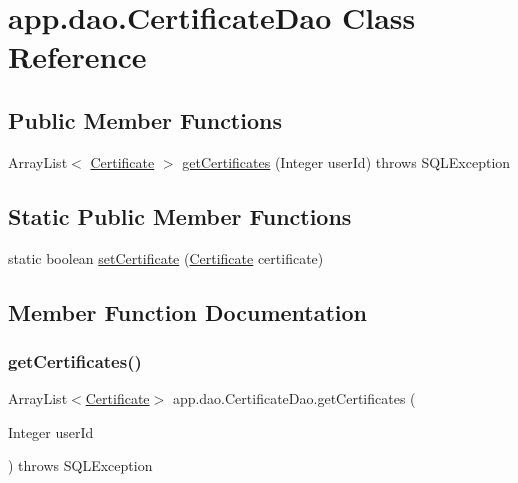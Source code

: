 \hypertarget{classapp_1_1dao_1_1_certificate_dao}{}\section{app.\+dao.\+Certificate\+Dao Class Reference}
\label{classapp_1_1dao_1_1_certificate_dao}
\subsection*{Public Member Functions}
\begin{DoxyCompactItemize}
\item 
Array\+List$<$ \mbox{\hyperlink{classapp_1_1entity_1_1_certificate}{Certificate}} $>$ \mbox{\hyperlink{classapp_1_1dao_1_1_certificate_dao_a62635ecd7b619b079f7a42bea0957257}{get\+Certificates}} (Integer user\+Id)  throws S\+Q\+L\+Exception 
\end{DoxyCompactItemize}
\subsection*{Static Public Member Functions}
\begin{DoxyCompactItemize}
\item 
static boolean \mbox{\hyperlink{classapp_1_1dao_1_1_certificate_dao_ade18e806b7233ecf641badf6d7fc2c52}{set\+Certificate}} (\mbox{\hyperlink{classapp_1_1entity_1_1_certificate}{Certificate}} certificate)
\end{DoxyCompactItemize}


\subsection{Member Function Documentation}
\mbox{\label{classapp_1_1dao_1_1_certificate_dao_a62635ecd7b619b079f7a42bea0957257}} 
\subsubsection{\texorpdfstring{getCertificates()}{getCertificates()}}
{\footnotesize\ttfamily Array\+List$<$\mbox{\hyperlink{classapp_1_1entity_1_1_certificate}{Certificate}}$>$ app.\+dao.\+Certificate\+Dao.\+get\+Certificates (\begin{DoxyParamCaption}\item[{Integer}]{user\+Id }\end{DoxyParamCaption}) throws S\+Q\+L\+Exception}



